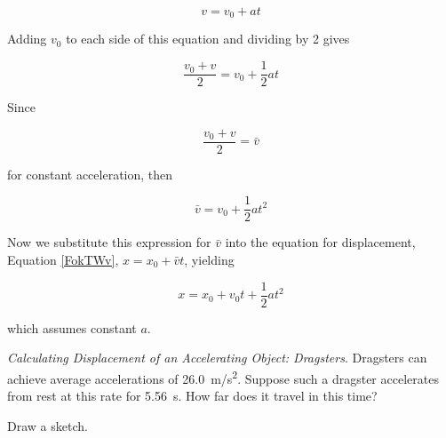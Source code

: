 \documentclass[main-ap-physics.tex]{subfiles}
\begin{document}
\begin{equation*}
    v = v_0 + a t
\end{equation*}

Adding $v_0$ to each side of this equation and dividing by 2 gives

\begin{equation*}
    \frac{v_0 + v}{2} = v_0 + \frac{1}{2} a t
\end{equation*}

Since

\begin{equation*}
    \frac{v_0 + v}{2} = \bar{v}
\end{equation*}

for constant acceleration, then 

\begin{equation*}
    \bar{v} = v_0 + \frac{1}{2} a t^2 
\end{equation*}

Now we substitute this expression for $\bar{v}$ into the equation for displacement, Equation \eqref{FokTWv}, $x = x_0 + \bar{v} t$, yielding

\begin{equation} \label{03Tfzm}
    x = x_0 + v_0 t + \frac{1}{2} a t^2
\end{equation}

which assumes constant $a$.

\vspace{1em}

\cyanhrule

\begin{example} \label{7ddBPA}
    \textit{Calculating Displacement of an Accelerating Object: Dragsters}. Dragsters can achieve average accelerations of \SI{26.0}{m/s^2}. Suppose such a dragster accelerates from rest at this rate for \SI{5.56}{s}. How far does it travel in this time?
\end{example}

\Solution Draw a sketch.

\begin{center}
\end{center}
\end{document}
